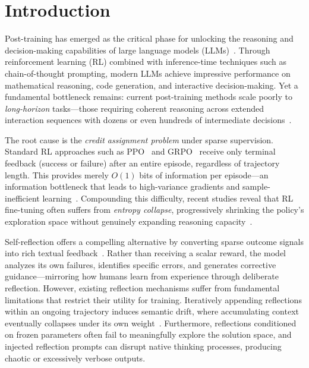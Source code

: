 \documentclass{article}
\theoremstyle{plain}
\theoremstyle{definition}
\theoremstyle{remark}
\begin{document}
\section{Introduction}
\label{intro}

Post-training has emerged as the critical phase for unlocking the reasoning and decision-making capabilities of large language models (LLMs)~\cite{openai2024gpt4technicalreport,llama3herdmodels,deepseekmath}. 
Through reinforcement learning (RL) combined with inference-time techniques such as chain-of-thought prompting, modern LLMs achieve impressive performance on mathematical reasoning, code generation, and interactive decision-making. 
Yet a fundamental bottleneck remains: current post-training methods scale poorly to \emph{long-horizon} tasks—those requiring coherent reasoning across extended interaction sequences with dozens or even hundreds of intermediate decisions~\cite{turnsunlockinglonghorizonagentic,llmslostmultiturnconversation}.

The root cause is the \emph{credit assignment problem} under sparse supervision. 
Standard RL approaches such as PPO~\cite{proximalpolicyoptimizationalgorithms} and GRPO~\cite{deepseekmath} receive only terminal feedback (success or failure) after an entire episode, regardless of trajectory length. 
This provides merely $O(1)$ bits of information per episode—an information bottleneck that leads to high-variance gradients and sample-inefficient learning~\cite{lu2025onpolicydistillation}.
Compounding this difficulty, recent studies reveal that RL fine-tuning often suffers from \emph{entropy collapse}, progressively shrinking the policy's exploration space without genuinely expanding reasoning capacity~\cite{cui2025entropymechanismreinforcementlearning,doesreinforcementlearningreally}.

Self-reflection offers a compelling alternative by converting sparse outcome signals into rich textual feedback~\cite{shinn2023reflexion,madaan2023selfrefine}. 
Rather than receiving a scalar reward, the model analyzes its own failures, identifies specific errors, and generates corrective guidance—mirroring how humans learn from experience through deliberate reflection. However, existing reflection mechanisms suffer from fundamental limitations that restrict their utility for training. Iteratively appending reflections within an ongoing trajectory induces semantic drift, where accumulating context eventually collapses under its own weight~\cite{llmslostmultiturnconversation}. Furthermore, reflections conditioned on frozen parameters often fail to meaningfully explore the solution space, and injected reflection prompts can disrupt native thinking processes, producing chaotic or excessively verbose outputs.
\end{document}
